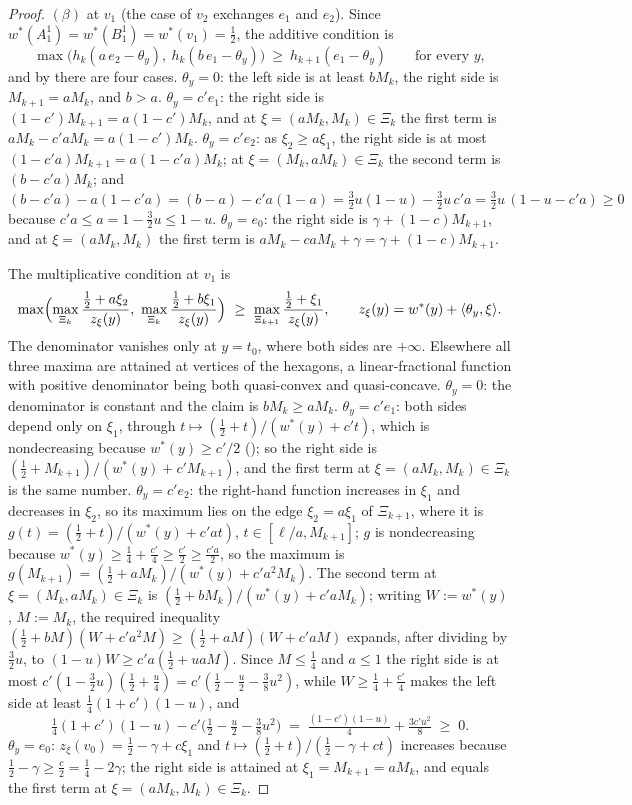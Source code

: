 \begin{proof}
$(\beta)$ at $v_1$ (the case of $v_2$ exchanges $e_1$ and $e_2$). Since
$w^\ast(A^{1}_1)=w^\ast(B^{1}_1)=w^\ast(v_1)=\tfrac12$, the additive
condition is
\[
  \max\bigl(h_k(a\,e_2-\theta_y),\ h_k(b\,e_1-\theta_y)\bigr)\ \ge\
  h_{k+1}(e_1-\theta_y)\qquad\text{for every }y,
\]
and by  there are four cases.
\emph{$\theta_y=0$}: the left side is at least $bM_k$, the right side is
$M_{k+1}=aM_k$, and $b>a$.
\emph{$\theta_y=c'e_1$}: the right side is $(1-c')M_{k+1}=a(1-c')M_k$,
and at $\xi=(aM_k,M_k)\in\Xi_k$ the first term is
$aM_k-c'aM_k=a(1-c')M_k$.
\emph{$\theta_y=c'e_2$}: as $\xi_2\ge a\xi_1$, the right side is at most
$(1-c'a)M_{k+1}=a(1-c'a)M_k$; at $\xi=(M_k,aM_k)\in\Xi_k$ the second term
is $(b-c'a)M_k$; and
$(b-c'a)-a(1-c'a)=(b-a)-c'a(1-a)=\tfrac32u(1-u)-\tfrac32u\,c'a
=\tfrac32u\,(1-u-c'a)\ge0$ because $c'a\le a=1-\tfrac32u\le1-u$.
\emph{$\theta_y=e_0$}: the right side is $\gamma+(1-c)M_{k+1}$, and at
$\xi=(aM_k,M_k)$ the first term is $aM_k-caM_k+\gamma=\gamma+(1-c)M_{k+1}$.

The multiplicative condition at $v_1$ is
\[
  \max\Bigl(\max_{\Xi_k}\frac{\tfrac12+a\xi_2}{z_\xi(y)},\
  \max_{\Xi_k}\frac{\tfrac12+b\xi_1}{z_\xi(y)}\Bigr)\ \ge\
  \max_{\Xi_{k+1}}\frac{\tfrac12+\xi_1}{z_\xi(y)},\qquad
  z_\xi(y)=w^\ast(y)+\langle\theta_y,\xi\rangle .
\]
The denominator vanishes only at $y=t_0$, where both sides are $+\infty$.
Elsewhere all three maxima are attained at vertices of the hexagons, a
linear-fractional function with positive denominator being both
quasi-convex and quasi-concave.
\emph{$\theta_y=0$}: the denominator is constant and the claim is
$bM_k\ge aM_k$.
\emph{$\theta_y=c'e_1$}: both sides depend only on $\xi_1$, through
$t\mapsto(\tfrac12+t)/(w^\ast(y)+c't)$, which is nondecreasing because
$w^\ast(y)\ge c'/2$ (); so the right side is
$(\tfrac12+M_{k+1})/(w^\ast(y)+c'M_{k+1})$, and the first term at
$\xi=(aM_k,M_k)\in\Xi_k$ is the same number.
\emph{$\theta_y=c'e_2$}: the right-hand function increases in $\xi_1$ and
decreases in $\xi_2$, so its maximum lies on the edge $\xi_2=a\xi_1$ of
$\Xi_{k+1}$, where it is $g(t)=(\tfrac12+t)/(w^\ast(y)+c'at)$,
$t\in[\ell/a,M_{k+1}]$; $g$ is nondecreasing because
$w^\ast(y)\ge\tfrac14+\tfrac{c'}4\ge\tfrac{c'}2\ge\tfrac{c'a}2$, so the
maximum is $g(M_{k+1})=(\tfrac12+aM_k)/(w^\ast(y)+c'a^{2}M_k)$. The
second term at $\xi=(M_k,aM_k)\in\Xi_k$ is
$(\tfrac12+bM_k)/(w^\ast(y)+c'aM_k)$; writing $W:=w^\ast(y)$, $M:=M_k$,
the required inequality
$(\tfrac12+bM)(W+c'a^{2}M)\ge(\tfrac12+aM)(W+c'aM)$ expands, after
dividing by $\tfrac32u$, to $(1-u)W\ge c'a(\tfrac12+uaM)$. Since
$M\le\tfrac14$ and $a\le1$ the right side is at most
$c'(1-\tfrac32u)(\tfrac12+\tfrac u4)=c'(\tfrac12-\tfrac u2-\tfrac38u^{2})$,
while $W\ge\tfrac14+\tfrac{c'}4$ makes the left side at least
$\tfrac14(1+c')(1-u)$, and
\[
  \tfrac14(1+c')(1-u)-c'\bigl(\tfrac12-\tfrac u2-\tfrac38u^{2}\bigr)
  \;=\;\tfrac{(1-c')(1-u)}4+\tfrac{3c'u^{2}}8\;\ge\;0 .
\]
\emph{$\theta_y=e_0$}: $z_\xi(v_0)=\tfrac12-\gamma+c\xi_1$ and
$t\mapsto(\tfrac12+t)/(\tfrac12-\gamma+ct)$ increases because
$\tfrac12-\gamma\ge\tfrac c2=\tfrac14-2\gamma$; the right side is
attained at $\xi_1=M_{k+1}=aM_k$, and equals the first term at
$\xi=(aM_k,M_k)\in\Xi_k$.


\end{proof}

